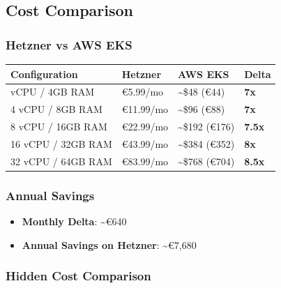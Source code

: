 \subsection{Cost Comparison}\label{cost-comparison}

\subsubsection{Hetzner vs AWS EKS}\label{hetzner-vs-aws-eks}

{\def\LTcaptype{none} %
\begin{longtable}[]{@{}llll@{}}
\toprule\noalign{}
Configuration & Hetzner & AWS EKS & Delta \\
\midrule\noalign{}
\endhead
\bottomrule\noalign{}
\endlastfoot
2 vCPU / 4GB RAM & €5.99/mo & \textasciitilde\$48 (€44) & \textbf{7x} \\
4 vCPU / 8GB RAM & €11.99/mo & \textasciitilde\$96 (€88) &
\textbf{7x} \\
8 vCPU / 16GB RAM & €22.99/mo & \textasciitilde\$192 (€176) &
\textbf{7.5x} \\
16 vCPU / 32GB RAM & €43.99/mo & \textasciitilde\$384 (€352) &
\textbf{8x} \\
32 vCPU / 64GB RAM & €83.99/mo & \textasciitilde\$768 (€704) &
\textbf{8.5x} \\
\end{longtable}
}

\subsubsection{Annual Savings}\label{annual-savings}

\begin{itemize}
\tightlist
\item
  \textbf{Monthly Delta}: \textasciitilde€640
\item
  \textbf{Annual Savings on Hetzner}: \textasciitilde€7,680
\end{itemize}

\subsubsection{Hidden Cost Comparison}\label{hidden-cost-comparison}

